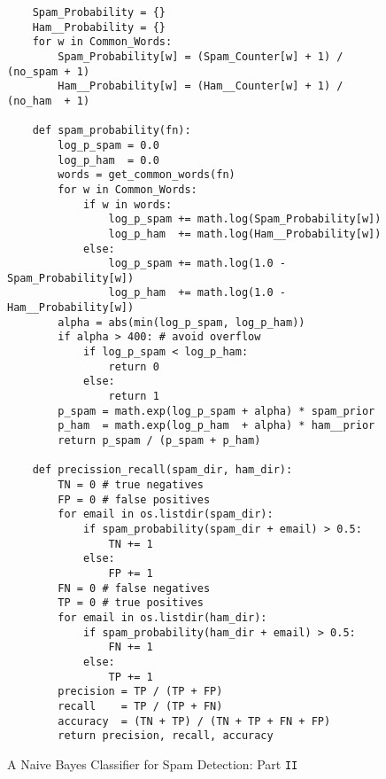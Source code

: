 \begin{figure}[!ht]
\centering

\begin{verbatim}
    Spam_Probability = {}
    Ham__Probability = {}
    for w in Common_Words:
        Spam_Probability[w] = (Spam_Counter[w] + 1) / (no_spam + 1) 
        Ham__Probability[w] = (Ham__Counter[w] + 1) / (no_ham  + 1) 

    def spam_probability(fn):
        log_p_spam = 0.0
        log_p_ham  = 0.0
        words = get_common_words(fn)
        for w in Common_Words:
            if w in words:
                log_p_spam += math.log(Spam_Probability[w])
                log_p_ham  += math.log(Ham__Probability[w])
            else:
                log_p_spam += math.log(1.0 - Spam_Probability[w])
                log_p_ham  += math.log(1.0 - Ham__Probability[w])
        alpha = abs(min(log_p_spam, log_p_ham))
        if alpha > 400: # avoid overflow
            if log_p_spam < log_p_ham:
                return 0
            else:
                return 1
        p_spam = math.exp(log_p_spam + alpha) * spam_prior
        p_ham  = math.exp(log_p_ham  + alpha) * ham__prior
        return p_spam / (p_spam + p_ham)

    def precission_recall(spam_dir, ham_dir):
        TN = 0 # true negatives
        FP = 0 # false positives
        for email in os.listdir(spam_dir):
            if spam_probability(spam_dir + email) > 0.5:
                TN += 1
            else:
                FP += 1
        FN = 0 # false negatives
        TP = 0 # true positives
        for email in os.listdir(ham_dir):
            if spam_probability(ham_dir + email) > 0.5:
                FN += 1
            else:
                TP += 1
        precision = TP / (TP + FP)
        recall    = TP / (TP + FN)
        accuracy  = (TN + TP) / (TN + TP + FN + FP)
        return precision, recall, accuracy
\end{verbatim}
    
\caption{A Naive Bayes Classifier for Spam Detection: Part \texttt{II}}
\label{fig:Spam-Detection.ipynb-2}
\end{figure}


